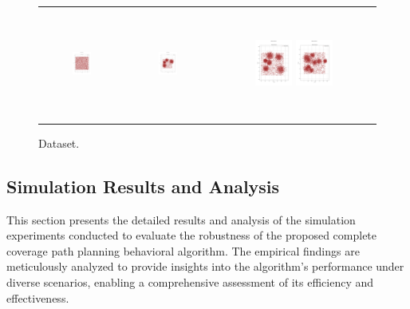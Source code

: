 \begin{figure}[p]
\begin{tabular}{ccc}
        \includegraphics[height=36mm,width=0.24\textwidth]{Images/data/51.png}
        & \includegraphics[height=36mm,width=0.24\textwidth]{Images/data/52.png}
        & \includegraphics[height=36mm,width=0.24\textwidth]{Images/data/53.png}
        \includegraphics[height=36mm,width=0.24\textwidth]{Images/data/54.png}\\[-4pt]
        
    \end{tabular}
    \caption{Dataset.\label{fig:Dataset}}
\end{figure}


\subsection{Simulation Results and Analysis}

This section presents the detailed results and analysis of the simulation experiments conducted to evaluate the robustness of the proposed complete coverage path planning behavioral algorithm. The empirical findings are meticulously analyzed to provide insights into the algorithm's performance under diverse scenarios, enabling a comprehensive assessment of its efficiency and effectiveness. 

